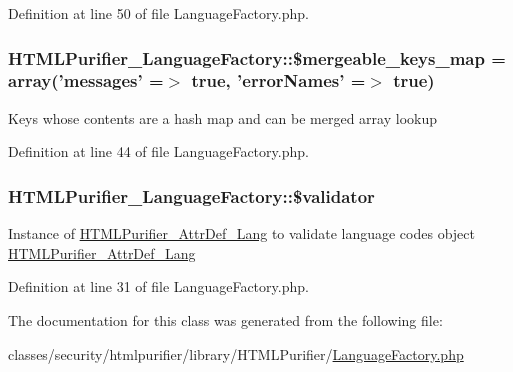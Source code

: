 Definition at line 50 of file Language\+Factory.\+php.

\hypertarget{classHTMLPurifier__LanguageFactory_a52e2d6740f4e7411697bad9f85e95892}{
\subsubsection[{\$mergeable\+\_\+keys\+\_\+map}]{\setlength{\rightskip}{0pt plus 5cm}H\+T\+M\+L\+Purifier\+\_\+\+Language\+Factory\+::\$mergeable\+\_\+keys\+\_\+map = array('messages' =$>$ true, 'error\+Names' =$>$ true)\hspace{0.3cm}{\ttfamily [protected]}}}\label{classHTMLPurifier__LanguageFactory_a52e2d6740f4e7411697bad9f85e95892}
Keys whose contents are a hash map and can be merged  array lookup 

Definition at line 44 of file Language\+Factory.\+php.

\hypertarget{classHTMLPurifier__LanguageFactory_adc75fa793689675394f89fd920804105}{
\subsubsection[{\$validator}]{\setlength{\rightskip}{0pt plus 5cm}H\+T\+M\+L\+Purifier\+\_\+\+Language\+Factory\+::\$validator\hspace{0.3cm}{\ttfamily [protected]}}}\label{classHTMLPurifier__LanguageFactory_adc75fa793689675394f89fd920804105}
Instance of \hyperlink{classHTMLPurifier__AttrDef__Lang}{H\+T\+M\+L\+Purifier\+\_\+\+Attr\+Def\+\_\+\+Lang} to validate language codes  object \hyperlink{classHTMLPurifier__AttrDef__Lang}{H\+T\+M\+L\+Purifier\+\_\+\+Attr\+Def\+\_\+\+Lang} 

Definition at line 31 of file Language\+Factory.\+php.



The documentation for this class was generated from the following file\+:\begin{DoxyCompactItemize}
\item 
classes/security/htmlpurifier/library/\+H\+T\+M\+L\+Purifier/\hyperlink{LanguageFactory_8php}{Language\+Factory.\+php}\end{DoxyCompactItemize}
